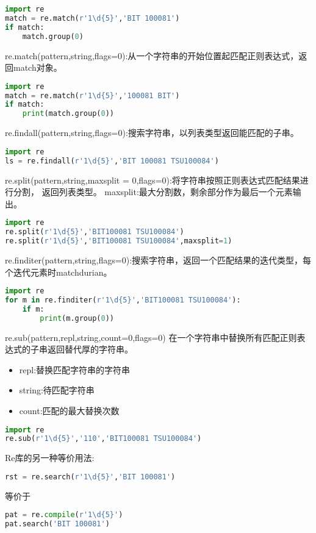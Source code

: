 \documentclass{book}
\begin{document}
\begin{lstlisting}[language=Python]
import re
match = re.match(r'1\d{5}','BIT 100081')
if match:
    match.group(0)
\end{lstlisting}
re.match(pattern,string,flags=0):从一个字符串的开始位置起匹配正则表达式，返回match对象。
\begin{lstlisting}[language=Python]
import re
match = re.match(r'1\d{5}','100081 BIT')
if match:
    print(match.group(0))
\end{lstlisting}
re.findall(pattern,string,flags=0):搜索字符串，以列表类型返回能匹配的子串。
\begin{lstlisting}[language=Python]
import re
ls = re.findall(r'1\d{5}','BIT 100081 TSU100084')
\end{lstlisting}
re.split(pattern,string,maxsplit = 0,flags=0):将字符串按照正则表达式匹配结果进行分割，
返回列表类型。\newline
maxsplit:最大分割数，剩余部分作为最后一个元素输出。\newline
\begin{lstlisting}[language=Python]
import re
re.split(r'1\d{5}','BIT100081 TSU100084')
re.split(r'1\d{5}','BIT100081 TSU100084',maxsplit=1)
\end{lstlisting}
re.finditer(pattern,string,flags=0):搜索字符串，返回一个匹配结果的迭代类型，每个迭代元素时matchdurian。
\begin{lstlisting}[language=Python]
import re
for m in re.finditer(r'1\d{5}','BIT100081 TSU100084'):
    if m:
        print(m.group(0))
\end{lstlisting}
re.sub(pattern,repl,string,count=0,flags=0)
在一个字符串中替换所有匹配正则表达式的子串返回替代厚的字符串。
\begin{itemize}
\item repl:替换匹配字符串的字符串
\item string:待匹配字符串
\item count:匹配的最大替换次数
\end{itemize}
\begin{lstlisting}[language=Python]
import re
re.sub(r'1\d{5}','110','BIT100081 TSU100084')
\end{lstlisting}
Re库的另一种等价用法:
\begin{lstlisting}[language=Python]
rst = re.search(r'1\d{5}','BIT 100081')
\end{lstlisting}
等价于
\begin{lstlisting}[language=Python]
pat = re.compile(r'1\d{5}')
pat.search('BIT 100081')
\end{lstlisting}
\end{document}
